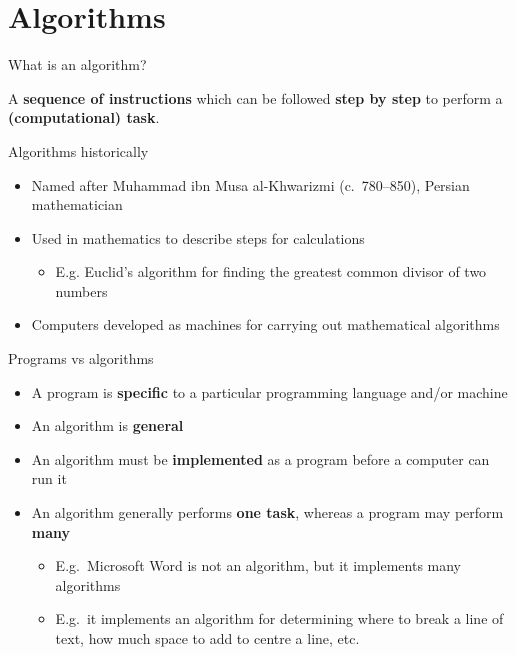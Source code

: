 \part{Algorithms}
\frame{\partpage}

\begin{frame}{What is an algorithm?}
	\pause\begin{center}
		A \textbf{sequence of instructions} which can be followed \textbf{step by step}
		to perform a \textbf{(computational) task}.
	\end{center}
\end{frame}

\begin{frame}{Algorithms historically}
	\begin{itemize}
		\pause\item Named after Muhammad ibn Musa al-Khwarizmi (c.\ 780--850), Persian mathematician
		\pause\item Used in mathematics to describe steps for calculations
            \begin{itemize}
                \pause\item E.g. Euclid's algorithm for finding the greatest common divisor of two numbers
            \end{itemize}
        \pause\item Computers developed as machines for carrying out mathematical algorithms
	\end{itemize}
\end{frame}

\begin{frame}{Programs vs algorithms}
	\begin{itemize}
		\pause\item A program is \textbf{specific} to a particular programming language and/or machine
		\pause\item An algorithm is \textbf{general}
		\pause\item An algorithm must be \textbf{implemented} as a program before a computer can run it
		\pause\item An algorithm generally performs \textbf{one task}, whereas a program may perform \textbf{many}
		\begin{itemize}
			\pause\item E.g.\ Microsoft Word is not an algorithm, but it implements many algorithms
			\pause\item E.g.\ it implements an algorithm for determining where to break a line of text,
				how much space to add to centre a line, etc.
		\end{itemize}
	\end{itemize}
\end{frame}

